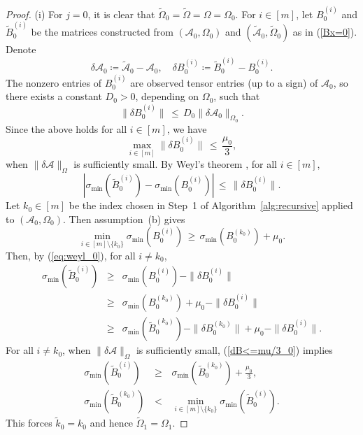 \documentclass{amsart}
\newcommand{\dt}{\delta}
\newcommand{\tomg}{\widetilde{\Omega}}
\newcommand{\tk}{\tilde{k}}
\newcommand{\sig}{\sigma}
\newcommand{\reff}[1]{(\ref{#1})}
\newcommand{\mc}[1]{\mathcal{#1}}
\newcommand{\be}{\begin{equation}}
\newcommand{\ee}{\end{equation}}
\newcommand{\baray}{\begin{array}}
\newcommand{\earay}{\end{array}}
\theoremstyle{definition}
\numberwithin{equation}{section}
\begin{document}
\begin{proof}
(i) For $j=0$,
it is clear that $\tomg_0 = \tomg = \Omega = \Omega_0$.
For $i \in [m]$, 
let $B_0^{(i)}$ and $\widetilde{B}_0^{(i)}$ be the matrices constructed from 
$(\mc{A}_0, \Omega_0)$ and $(\widetilde{\mc{A}}_0, \tomg_0)$ as in \reff{Bx=0}.
Denote
\[
\dt \mc{A}_0 \coloneqq \widetilde{\mc{A}}_0 - \mc{A}_0, 
\quad \dt B_0^{(i)} \coloneqq \widetilde{B}_0^{(i)} - B_0^{(i)}.
\]
The nonzero entries of $B_0^{(i)}$ are observed tensor entries (up to a sign) of $\mc{A}_0$,
so there exists a constant $D_0 > 0$, depending on $\Omega_0$, such that
\be\label{dB0<=dA0}
\|\dt B_0^{(i)}\| \,\le\, D_0 \|\dt \mc{A}_0 \|_{\Omega_0}.
\ee
Since the above holds for all $i \in [m]$, we have
\be\label{dB<=mu/3_0}
\max_{i \in [m]} \|\dt B_0^{(i)}\| \,\le\, \frac{\mu_0}{3},
\ee 
when $\|\dt \mc{A}\|_{\Omega}$ is sufficiently small.
By Weyl's theorem \cite[Corollary~5.1]{demmel97}, for all $i \in [m]$,
\be\label{eq:weyl_0}
| \sig_{\min}(\widetilde{B}_0^{(i)}) - \sig_{\min}(B_0^{(i)}) | \,\le\, \|\dt B_0^{(i)}\|.
\ee
Let $k_0 \in [m]$ be the index chosen in Step~1 of Algorithm~\ref{alg:recursive} applied to $(\mc{A}_0, \Omega_0)$.
Then assumption~(b) gives
\[
\min_{i \in [m] \setminus \{k_0\}} \sig_{\min}(B_0^{(i)}) \,\ge\, \sig_{\min}(B_0^{(k_0)}) + \mu_0.
\]
Then, by \reff{eq:weyl_0}, for all $i \ne k_0$,
\be\label{sigBji>=?_0}
\baray{rcl}
\sig_{\min}(\widetilde{B}_0^{(i)}) &\ge& \sig_{\min}(B_0^{(i)}) - \|\dt B_0^{(i)}\| \\
&\ge& \sig_{\min}(B_0^{(k_0)}) + \mu_0 - \|\dt B_0^{(i)}\| \\ 
&\ge& \sig_{\min}(\widetilde{B}_0^{(k_0)}) - \|\dt B_0^{(k_0)}\| + \mu_0 - \|\dt B_0^{(i)}\|.
\earay
\ee
For all $i \ne k_0$, when $\|\dt \mc{A}\|_{\Omega}$ is sufficiently small, \reff{dB<=mu/3_0} implies
\begin{eqnarray*}
\sig_{\min}(\widetilde{B}_0^{(i)}) &\,\ge\,& \sig_{\min}(\widetilde{B}_0^{(k_0)}) + \frac{\mu_0}{3}, \\
\sig_{\min}(\widetilde{B}_0^{(k_0)}) &\,<\,& \min\limits_{i \in [m] \setminus \{k_0\}} \sig_{\min}(\widetilde{B}_0^{(i)}).
\end{eqnarray*}
This forces $\tk_0 = k_0$ and hence $\tomg_1 = \Omega_1$.






\end{proof}
\end{document}
